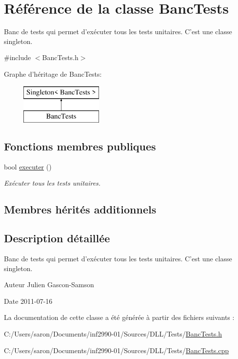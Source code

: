 \hypertarget{class_banc_tests}{\section{Référence de la classe Banc\-Tests}
\label{class_banc_tests}
}


Banc de tests qui permet d'exécuter tous les tests unitaires. C'est une classe singleton.  




{\ttfamily \#include $<$Banc\-Tests.\-h$>$}

Graphe d'héritage de Banc\-Tests\-:\begin{figure}[H]
\begin{center}
\leavevmode
\includegraphics[height=2.000000cm]{class_banc_tests}
\end{center}
\end{figure}
\subsection*{Fonctions membres publiques}
\begin{DoxyCompactItemize}
\item 
bool \hyperlink{group__inf2990_gab5d7fbfe7e3fbe00aa187caa10b1c506}{executer} ()
\begin{DoxyCompactList}\small\item\em Exécuter tous les tests unitaires. \end{DoxyCompactList}\end{DoxyCompactItemize}
\subsection*{Membres hérités additionnels}


\subsection{Description détaillée}
Banc de tests qui permet d'exécuter tous les tests unitaires. C'est une classe singleton. 

\begin{DoxyAuthor}{Auteur}
Julien Gascon-\/\-Samson 
\end{DoxyAuthor}
\begin{DoxyDate}{Date}
2011-\/07-\/16 
\end{DoxyDate}


La documentation de cette classe a été générée à partir des fichiers suivants \-:\begin{DoxyCompactItemize}
\item 
C\-:/\-Users/saron/\-Documents/inf2990-\/01/\-Sources/\-D\-L\-L/\-Tests/\hyperlink{_banc_tests_8h}{Banc\-Tests.\-h}\item 
C\-:/\-Users/saron/\-Documents/inf2990-\/01/\-Sources/\-D\-L\-L/\-Tests/\hyperlink{_banc_tests_8cpp}{Banc\-Tests.\-cpp}\end{DoxyCompactItemize}
